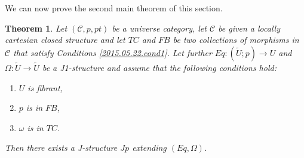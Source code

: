 \documentclass[12pt]{article}
\numberwithin{equation}{section}
\newtheorem{theorem}[proposition]{Theorem}
\newcommand{\llabel}[1]{\label{#1}}
\newcommand{\sr}{\rightarrow}
\newcommand{\wt}{\widetilde}
\begin{document}
%















We can now prove the second main theorem of this section.
%
\begin{theorem}
\llabel{2015.05.16.th1} Let $({\mathcal C},p,pt)$ be a universe category, let
$\mathcal C$ be given a locally cartesian closed structure and let $TC$ and
$FB$ be two collections of morphisms in $\mathcal C$ that satisfy Conditions
\ref{2015.05.22.cond1}. Let further $Eq:(\wt{U};p)\sr U$ and $\Omega:\wt{U}\sr
\wt{U}$ be a J1-structure and assume that the following conditions hold:
%
\begin{enumerate}
\item $U$ is fibrant,
\item $p$ is in $FB$,
\item $\omega$ is in $TC$.
\end{enumerate}
%
Then there exists a J-structure $Jp$ extending $(Eq,\Omega)$.
\end{theorem}
%
\end{document}
